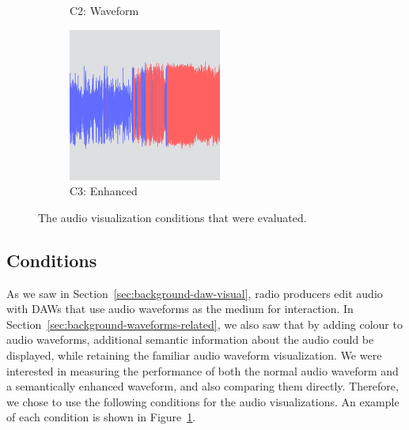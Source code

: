 \begin{figure}[p]
\begin{subfigure}{.3\textwidth}
    \caption{C2: Waveform}
  \end{subfigure}
  \begin{subfigure}{.3\textwidth}
    \centering
    \includegraphics[width=\columnwidth]{figs/condition3.png}
    \caption{C3: Enhanced}
  \end{subfigure}
  \caption{The audio visualization conditions that were evaluated.}
  \label{fig:conditions}
\end{figure}

\subsection{Conditions}\label{sec:colourised-conditions}
As we saw in Section~\ref{sec:background-daw-visual}, radio producers edit audio with DAWs that use audio waveforms as
the medium for interaction. In Section~\ref{sec:background-waveforms-related}, we also saw that by adding colour to
audio waveforms, additional semantic information about the audio could be displayed, while retaining the familiar
audio waveform visualization.  We were interested in measuring the performance of both the normal audio waveform and a
semantically enhanced waveform, and also comparing them directly.  Therefore, we chose to use the following conditions
for the audio visualizations. An example of each condition is shown in Figure~\ref{fig:conditions}.

